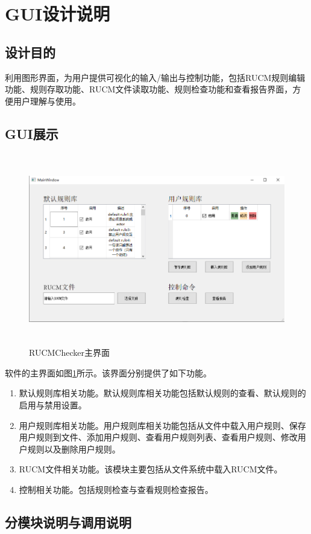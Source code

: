 \section{GUI设计说明}

\subsection{设计目的}
利用图形界面，为用户提供可视化的输入/输出与控制功能，包括RUCM规则编辑功能、规则存取功能、RUCM文件读取功能、规则检查功能和查看报告界面，方便用户理解与使用。
\subsection{GUI展示}
\begin{figure}[htbp]
	\centering
	\includegraphics[width=5.77222in,height=3.29306in]{src/gui-1.png}
	\caption{RUCMChecker主界面}
	\label{fig-gui-1}
\end{figure}
软件的主界面如图\ref{fig-gui-1}所示。该界面分别提供了如下功能。

\begin{enumerate}
	\item
	默认规则库相关功能。默认规则库相关功能包括默认规则的查看、默认规则的启用与禁用设置。
	\item
	用户规则库相关功能。用户规则库相关功能包括从文件中载入用户规则、保存用户规则到文件、添加用户规则、查看用户规则列表、查看用户规则、修改用户规则以及删除用户规则。
	\item
	RUCM文件相关功能。该模块主要包括从文件系统中载入RUCM文件。
	\item
	控制相关功能。包括规则检查与查看规则检查报告。
\end{enumerate}

\subsection{分模块说明与调用说明}

